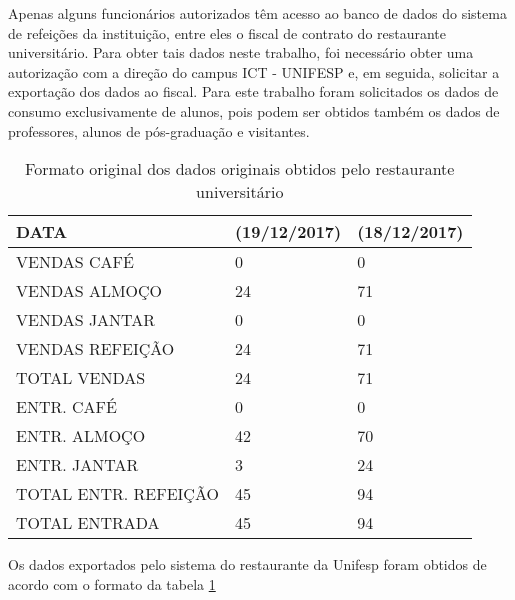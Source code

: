         	Apenas alguns funcionários autorizados têm acesso ao banco de dados do sistema de refeições da instituição, entre eles o fiscal de contrato do restaurante universitário. Para obter tais dados neste trabalho, foi necessário obter uma autorização com a direção do campus ICT - UNIFESP e, em seguida, solicitar a exportação dos dados ao fiscal. Para este trabalho foram solicitados os dados de consumo exclusivamente de alunos, pois podem ser obtidos também os dados de professores, alunos de pós-graduação e visitantes. 
    
        	\begin{table}[!ht]
        	    \centering
        	    \caption{Formato original dos dados originais obtidos pelo restaurante universitário}
                \begin{tabular}{|l|l|l|}
                    \hline
                    DATA                  & (19/12/2017) & (18/12/2017) \\ \hline
                    VENDAS CAFÉ           & 0            & 0            \\
                    VENDAS ALMOÇO         & 24           & 71           \\
                    VENDAS JANTAR         & 0            & 0            \\
                    VENDAS REFEIÇÃO      & 24           & 71           \\
                    TOTAL VENDAS          & 24           & 71           \\
                    ENTR. CAFÉ            & 0            & 0            \\
                    ENTR. ALMOÇO          & 42           & 70           \\
                    ENTR. JANTAR          & 3            & 24           \\
                    TOTAL ENTR. REFEIÇÃO & 45           & 94           \\
                    TOTAL ENTRADA         & 45           & 94           \\ \hline
                \end{tabular}
               
                \label{table:dadosrestaurante}
            \end{table}
            Os dados exportados pelo sistema do restaurante da Unifesp foram obtidos de acordo com o formato da tabela \ref{table:dadosrestaurante}\\
            
